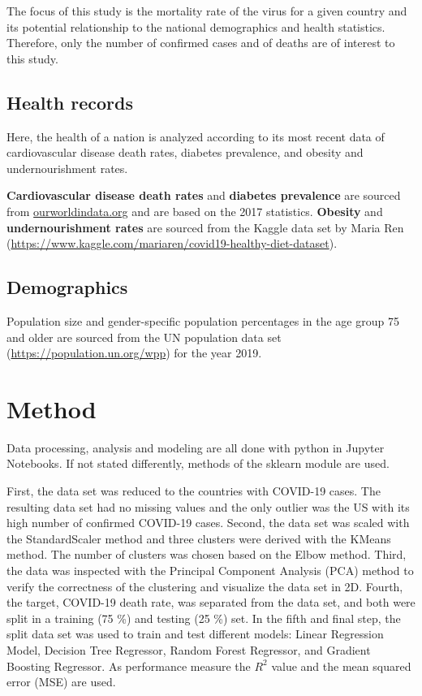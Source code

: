 \documentclass[a4paper, 11pt]{article} %
\begin{document}
The focus of this study is the mortality rate of the virus for a given country and its potential relationship to the national demographics and health statistics. Therefore, only the number of confirmed cases and of deaths are of interest to this study.

\subsection{Health records}
Here, the health of a nation is analyzed according to its most recent data of cardiovascular disease death rates, diabetes prevalence, and obesity and undernourishment rates. 

\textbf{Cardiovascular disease death rates} and \textbf{diabetes prevalence} are sourced from \url{ourworldindata.org} and are based on the 2017 statistics. \textbf{Obesity} and \textbf{undernourishment rates} are sourced from the Kaggle data set by Maria Ren (\url{https://www.kaggle.com/mariaren/covid19-healthy-diet-dataset}).

\subsection{Demographics}
Population size and gender-specific population percentages in the age group 75 and older are sourced from the UN population data set (\url{https://population.un.org/wpp}) for the year 2019.

\section{Method}
Data processing, analysis and modeling are all done with python in Jupyter Notebooks. If not stated differently, methods of the sklearn module are used.

First, the data set was reduced to the countries with COVID-19 cases. The resulting data set had no missing values and the only outlier was the US with its high number of confirmed COVID-19 cases. Second, the data set was scaled with the StandardScaler method and three clusters were derived with the KMeans method. The number of clusters was chosen based on the Elbow method. Third, the data was inspected with the Principal Component Analysis (PCA) method to verify the correctness of the clustering and visualize the data set in 2D. Fourth, the target, COVID-19 death rate, was separated from the data set, and both were split in a training (75 \%) and testing (25 \%) set. In the fifth and final step, the split data set was used to train and test different models: Linear Regression Model, Decision Tree Regressor, Random Forest Regressor, and Gradient Boosting Regressor. As performance measure the $R^2$ value and the mean squared error (MSE) are used.
\end{document}

